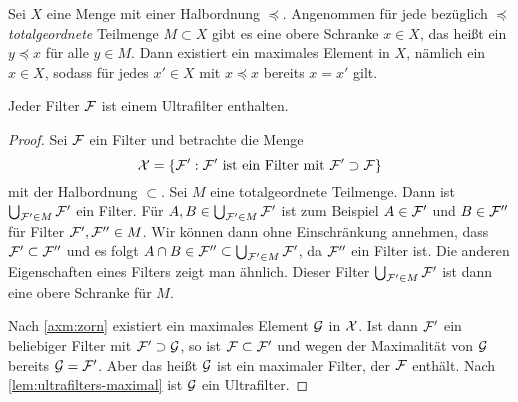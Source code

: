 \begin{axiom}\label{axm:zorn}
  Sei $X$ eine Menge mit einer Halbordnung ${\preccurlyeq}$. Angenommen für jede bezüglich ${\preccurlyeq}$ \emph{totalgeordnete} Teilmenge $M\subset X$ gibt es eine obere Schranke $x\in X$, das heißt ein $y\preccurlyeq x$ für alle $y\in M$. Dann existiert ein maximales Element in $X$, nämlich ein $x\in X$, sodass für jedes $x'\in X$ mit $x\preccurlyeq x$ bereits $x = x'$ gilt.
\end{axiom}

\begin{lemma}[Ultrafilterlemma]\label{ultrafilter-lemma}
  Jeder Filter $\cal F$ ist einem Ultrafilter enthalten.
\end{lemma}
\begin{proof}
  Sei $\cal F$ ein Filter und betrachte die Menge
  \[
    \cal X = \{\cal F' : \text{$\cal F'$ ist ein Filter mit $\cal F'\supset \cal F$}\}
  \]
  mit der Halbordnung ${\subset}$. Sei $M$ eine totalgeordnete Teilmenge. Dann ist $\bigcup_{\cal F'\in M}\cal F'$ ein Filter. Für $A,B\in \bigcup_{\cal F'\in M} \cal F'$ ist zum Beispiel $A\in\cal F'$ und $B\in\cal F''$ für Filter $\cal F',\cal F''\in M$. Wir können dann ohne Einschränkung annehmen, dass $\cal F'\subset\cal F''$ und es folgt $A\cap B\in\cal F''\subset\bigcup_{\cal F'\in M}\cal F'$, da $\cal F''$ ein Filter ist. Die anderen Eigenschaften eines Filters zeigt man ähnlich. Dieser Filter $\bigcup_{\cal F'\in M}\cal F'$ ist dann eine obere Schranke für $M$.

  Nach \autoref{axm:zorn} existiert ein maximales Element $\cal G$ in  $\cal X$. Ist dann $\cal F'$ ein beliebiger Filter mit $\cal F'\supset \cal G$, so ist $\cal F\subset\cal F'$ und wegen der Maximalität von $\cal G$ bereits $\cal G = \cal F'$. Aber das heißt $\cal G$ ist ein maximaler Filter, der $\cal F$ enthält. Nach \autoref{lem:ultrafilters-maximal} ist $\cal G$ ein Ultrafilter.
\end{proof}

